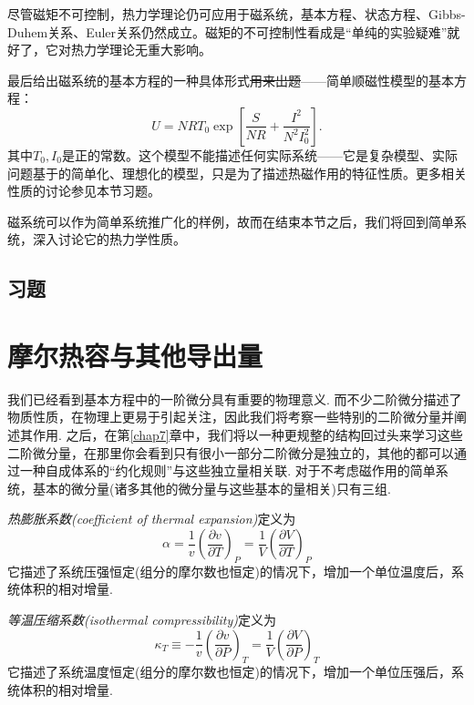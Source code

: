 尽管磁矩不可控制，热力学理论仍可应用于磁系统，基本方程、状态方程、Gibbs-Duhem关系、Euler关系仍然成立。磁矩的不可控制性看成是“单纯的实验疑难”就好了，它对热力学理论无重大影响。

最后给出磁系统的基本方程的一种具体形式\sout{用来出题}——简单顺磁性模型的基本方程：
\begin{equation}
    U = NRT_0 \exp \left[ \frac{S}{NR} + \frac{I^2}{N^2 I_0^2} \right].
\label{equ3.66}
\end{equation}
其中$T_0, I_0$是正的常数。这个模型不能描述任何实际系统——它是复杂模型、实际问题基于的简单化、理想化的模型，只是为了描述热磁作用的特征性质。更多相关性质的讨论参见本节习题。

磁系统可以作为简单系统推广化的样例，故而在结束本节之后，我们将回到简单系统，深入讨论它的热力学性质。

\subsection*{习题}


\section{摩尔热容与其他导出量}
\label{sec3.9}
我们已经看到基本方程中的一阶微分具有重要的物理意义. 而不少二阶微分描述了物质性质，在物理上更易于引起关注，因此我们将考察一些特别的二阶微分量并阐述其作用. 之后，在第\ref{chap7}章中，我们将以一种更规整的结构回过头来学习这些二阶微分量，在那里你会看到只有很小一部分二阶微分是独立的，其他的都可以通过一种自成体系的“约化规则”与这些独立量相关联. 对于不考虑磁作用的简单系统，基本的微分量(诸多其他的微分量与这些基本的量相关)只有三组.

{\it 热膨胀系数(coefficient of thermal expansion)}定义为
\begin{equation}
\label{equ3.67}
\alpha=\frac{1}{v}\left(\frac{\partial v}{\partial T}\right)_P=\frac{1}{V}\left(\frac{\partial V}{\partial T}\right)_P
\end{equation}
它描述了系统压强恒定(组分的摩尔数也恒定)的情况下，增加一个单位温度后，系统体积的相对增量.

{\it 等温压缩系数(isothermal compressibility)}定义为
\begin{equation}
\label{equ3.68}
\kappa_T\equiv-\frac{1}{v}\left(\frac{\partial v}{\partial P}\right)_T=\frac{1}{V}\left(\frac{\partial V}{\partial P}\right)_T
\end{equation}
它描述了系统温度恒定(组分的摩尔数也恒定)的情况下，增加一个单位压强后，系统体积的相对增量.

